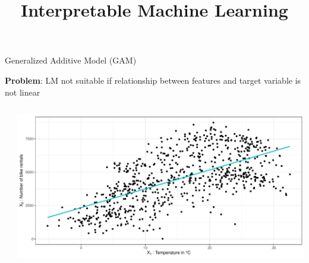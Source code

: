 \documentclass[11pt,compress,t,notes=noshow, aspectratio=169, xcolor=table]{beamer}
\title{Interpretable Machine Learning}
\date{}
\begin{document}
\newcommand{\titlefigure}{figure/gam_effects.pdf}
\newcommand{\learninggoals}{
\item Generalized additive model
\item Model-based boosting with simple base learners
\item Feature effect and importance in model-based boosting}



\begin{frame}{Generalized Additive Model (GAM) }

\textbf{Problem}: LM not suitable if relationship between features and target variable is not linear %

\begin{columns}[totalwidth=\textwidth]
    \begin{column}{0.6\textwidth}
    
    \end{column}
    \begin{column}{0.4\textwidth}
        \begin{center}
            \includegraphics[width = \textwidth]{figure/intro_lm_bike.pdf}
        \end{center}
    \end{column}
\end{columns}


\end{frame}
\end{document}

